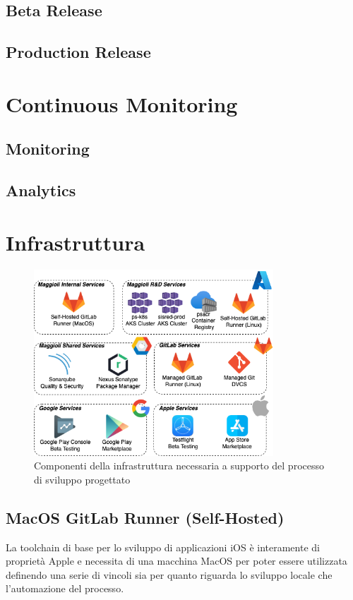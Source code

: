 \subsection{Beta Release}

\subsection{Production Release}

\section{Continuous Monitoring}
\subsection{Monitoring}
\subsection{Analytics}

\section{Infrastruttura}
\begin{figure}[H]
\centering
\includegraphics[width=0.8\textwidth]{img/tesi-3-infra.drawio.png}
\caption{Componenti della infrastruttura necessaria a supporto del processo di sviluppo progettato}
\end{figure}

\subsection{MacOS GitLab Runner (Self-Hosted)}
La toolchain di base per lo sviluppo di applicazioni iOS è interamente di proprietà Apple e necessita di una macchina MacOS per poter essere utilizzata definendo una serie di vincoli sia per quanto riguarda lo sviluppo locale che l'automazione del processo.
